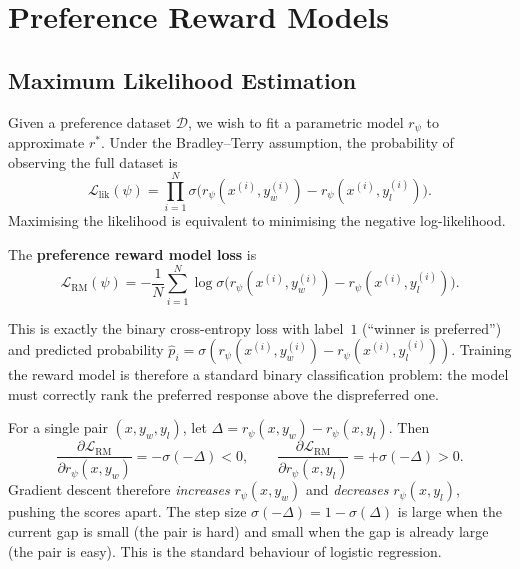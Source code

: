 \section{Preference Reward Models}
\label{sec:preference-rm}

\subsection{Maximum Likelihood Estimation}

Given a preference dataset $\mathcal{D}$, we wish to fit a parametric model $r_\psi$ to approximate $r^*$. Under the Bradley--Terry assumption, the probability of observing the full dataset is
\begin{equation}
\label{eq:bt-likelihood}
\mathcal{L}_{\text{lik}}(\psi)
= \prod_{i=1}^{N} \sigma\!\bigl(r_\psi(x^{(i)}, y_w^{(i)}) - r_\psi(x^{(i)}, y_l^{(i)})\bigr).
\end{equation}
Maximising the likelihood is equivalent to minimising the negative log-likelihood.

\begin{definition}
\label{def:rm-loss}
The \textbf{preference reward model loss} is
\begin{equation}
\label{eq:rm-loss}
\boxed{
\mathcal{L}_{\mathrm{RM}}(\psi)
= -\frac{1}{N}\sum_{i=1}^{N}
\log \sigma\!\bigl(r_\psi(x^{(i)}, y_w^{(i)}) - r_\psi(x^{(i)}, y_l^{(i)})\bigr).
}
\end{equation}
\end{definition}

This is exactly the binary cross-entropy loss with label~$1$ (``winner is preferred'') and predicted probability $\hat{p}_i = \sigma(r_\psi(x^{(i)}, y_w^{(i)}) - r_\psi(x^{(i)}, y_l^{(i)}))$. Training the reward model is therefore a standard binary classification problem: the model must correctly rank the preferred response above the dispreferred one.

\begin{proposition}
\label{prop:rm-gradient}
For a single pair $(x, y_w, y_l)$, let $\Delta = r_\psi(x,y_w) - r_\psi(x,y_l)$. Then
\[
\frac{\partial \mathcal{L}_{\mathrm{RM}}}{\partial r_\psi(x,y_w)} = -\sigma(-\Delta) < 0, \qquad
\frac{\partial \mathcal{L}_{\mathrm{RM}}}{\partial r_\psi(x,y_l)} = +\sigma(-\Delta) > 0.
\]
Gradient descent therefore \emph{increases} $r_\psi(x,y_w)$ and \emph{decreases} $r_\psi(x,y_l)$, pushing the scores apart. The step size $\sigma(-\Delta) = 1 - \sigma(\Delta)$ is large when the current gap is small (the pair is hard) and small when the gap is already large (the pair is easy). This is the standard behaviour of logistic regression.
\end{proposition}

